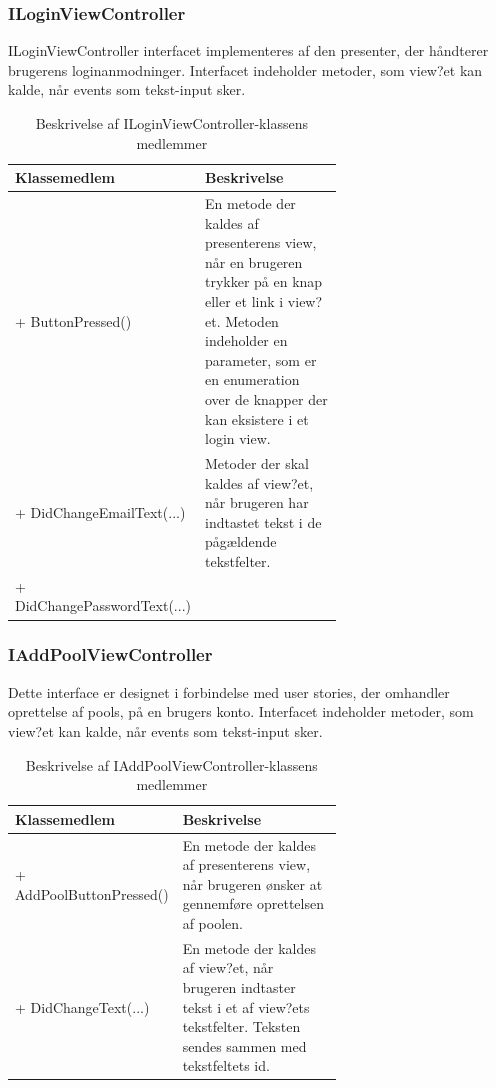 \subsubsection{ILoginViewController}
ILoginViewController interfacet implementeres af den presenter, der håndterer brugerens loginanmodninger. Interfacet indeholder metoder, som view?et kan kalde, når events som tekst-input sker.

\begin{table}
	\centering
	\begin{tabular}{| l | p{0.65\linewidth} |}
		\toprule
		\textbf{Klassemedlem}	& \textbf{Beskrivelse} \\
		\midrule
		+ ButtonPressed()				& En metode der kaldes af presenterens view, når en brugeren trykker på en knap eller et link i view?et. Metoden indeholder en parameter, som er en enumeration over de knapper der kan eksistere i et login view.	\\\hline
		+ DidChangeEmailText(...) 			& Metoder der skal kaldes af view?et, når brugeren har indtastet tekst i de pågældende tekstfelter. \\
		+ DidChangePasswordText(...) 				& \\
		\bottomrule
		\end{tabular}
	\caption{Beskrivelse af ILoginViewController-klassens medlemmer}
	\label{tab:table_design_iloginviewcontroller}	
\end{table}

\subsubsection{IAddPoolViewController}
Dette interface er designet i forbindelse med user stories, der omhandler oprettelse af pools, på en brugers konto. Interfacet indeholder metoder, som view?et kan kalde, når events som tekst-input sker.

\begin{table}
	\centering
	\begin{tabular}{| l | p{0.65\linewidth} |}
		\toprule
		\textbf{Klassemedlem}	& \textbf{Beskrivelse} \\
		\midrule
		+ AddPoolButtonPressed()				& En metode der kaldes af presenterens view, når brugeren ønsker at gennemføre oprettelsen af poolen.	\\\hline
		+ DidChangeText(...) 					& En metode der kaldes af view?et, når brugeren indtaster tekst i et af view?ets tekstfelter. Teksten sendes  sammen med tekstfeltets id. \\
		\bottomrule
		\end{tabular}
	\caption{Beskrivelse af IAddPoolViewController-klassens medlemmer}
	\label{tab:table_design_iaddpoolviewcontroller}	
\end{table}

